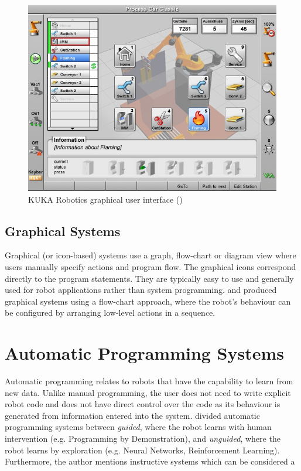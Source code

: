 \begin{figure}[h]
	\centering
	\includegraphics[width=0.8\linewidth]{figures/kuka.jpg}
	\caption{KUKA Robotics graphical user interface (\cite{kuka2006})}
	\label{fig:Kuka}
\end{figure} 


\subsection{Graphical Systems}\label{sssec:Graphical systems}
Graphical (or icon-based) systems use a graph, flow-chart or diagram view where users manually specify actions and program flow. 
The graphical icons correspond directly to the program statements.
They are typically easy to use and generally used for robot applications rather than system programming. 
\cite{lego2003} and \cite{bischoff2002morpha} produced graphical systems using a flow-chart approach, where the robot's behaviour can be configured by arranging low-level actions in a sequence.


\section{Automatic Programming Systems}\label{subsec:Automatic Programming Systems}
Automatic programming relates to robots that have the capability to learn from new data.
Unlike manual programming, the user does not need to write explicit robot code and does not have direct control over the code as its behaviour is generated from information entered into the system.
\cite{Biggs2003} divided automatic programming systems between \textit{guided}, where the robot learns with human intervention (e.g. Programming by Demonstration), and \textit{unguided}, where the robot learns by exploration (e.g. Neural Networks, Reinforcement Learning).
Furthermore, the author mentions instructive systems which can be considered a


